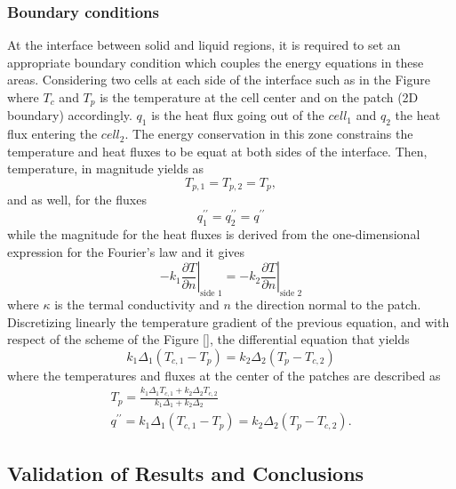 \subsubsection{Boundary conditions}
At the interface between solid and liquid regions, it is required to set an appropriate boundary condition which couples the energy equations in these areas.
\newline
Considering two cells at each side of the interface such as in the Figure
\newline
where $T_c$ and $T_p$ is the temperature at the cell center and on the patch (2D boundary) accordingly. $q_1$ is the heat flux going out of the $cell_1$ and $q_2$ the heat flux entering the $cell_2$. The energy conservation in this zone constrains the temperature and heat fluxes to be equat at both sides of the interface. 
Then, temperature, in magnitude yields as
\begin{equation}
	T_{p, 1}=T_{p, 2}=T_{p},
	\label{4.4}
\end{equation}
and as well, for the fluxes
\begin{equation}
q_{1}^{\prime \prime}=q_{2}^{\prime \prime}=q^{\prime \prime}
\label{4.5}
\end{equation}
while the magnitude for the heat fluxes is derived from the one-dimensional expression for the Fourier's law and it gives
\begin{equation}
-\left.k_{1} \frac{\partial T}{\partial n}\right|_{\text {side } 1}=-\left.k_{2} \frac{\partial T}{\partial n}\right|_{\text {side } 2}
\label{4.6}
\end{equation}
where $\kappa$ is the termal conductivity and $n$ the direction normal to the patch.
Discretizing linearly the temperature gradient of the previous equation, and with respect of the scheme of the Figure [], the differential equation that yields 
\begin{equation}
k_{1} \Delta_{1}\left(T_{c, 1}-T_{p}\right)=k_{2} \Delta_{2}\left(T_{p}-T_{c, 2}\right)
\label{4.7}
\end{equation}
where the temperatures and fluxes at the center of the patches are described as
\begin{equation}
\begin{gathered}
T_{p}=\frac{k_{1} \Delta_{1} T_{c, 1}+k_{2} \Delta_{2} T_{c, 2}}{k_{1} \Delta_{1}+k_{2} \Delta_{2}} \\
q^{\prime \prime}=k_{1} \Delta_{1}\left(T_{c, 1}-T_{p}\right)=k_{2} \Delta_{2}\left(T_{p}-T_{c, 2}\right) .
\end{gathered}
\label{4.8}
\end{equation}
\subsection{Validation of Results and Conclusions}

